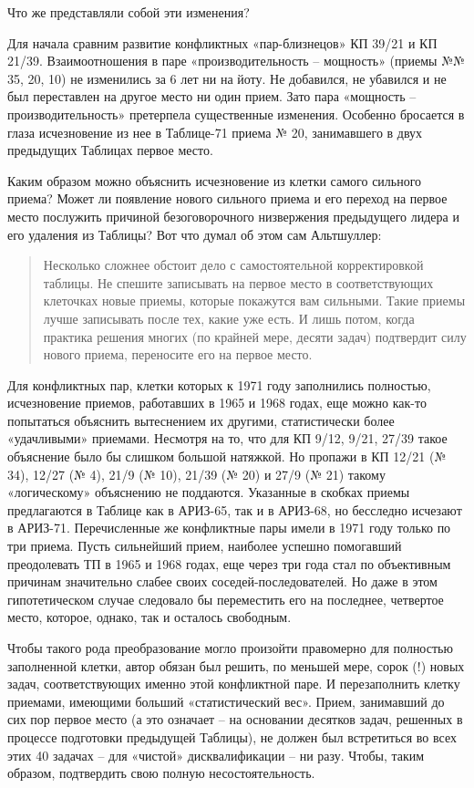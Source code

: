 \documentclass[11pt,a4paper]{article}
\begin{document}
Что же представляли собой эти изменения?

Для начала сравним развитие конфликтных «пар-близнецов» КП 39/21 и КП 21/39.
Взаимоотношения в паре «производительность -- мощность» (приемы №№ 35, 20, 10)
не изменились за 6 лет ни на йоту. Не добавился, не убавился и не был
переставлен на другое место ни один прием. Зато пара «мощность --
производительность» претерпела существенные изменения. Особенно бросается в
глаза исчезновение из нее в Таблице-71 приема № 20, занимавшего в двух
предыдущих Таблицах первое место.

Каким образом можно объяснить исчезновение из клетки самого сильного приема?
Может ли появление нового сильного приема и его переход на первое место
послужить причиной безоговорочного низвержения предыдущего лидера и его
удаления из Таблицы? Вот что думал об этом сам Альтшуллер:
\begin{quote}
  Несколько сложнее обстоит дело с самостоятельной корректировкой таблицы. Не
  спешите записывать на первое место в соответствующих клеточках новые приемы,
  которые покажутся вам сильными. Такие приемы лучше записывать после тех,
  какие уже есть. И лишь потом, когда практика решения многих (по крайней
  мере, десяти задач) подтвердит силу нового приема, переносите его на первое
  место.  \cite[стр. 274]{Altshuller1973}
\end{quote}
Для конфликтных пар, клетки которых к 1971 году заполнились полностью,
исчезновение приемов, работавших в 1965 и 1968 годах, еще можно как-то
попытаться объяснить вытеснением их другими, статистически более «удачливыми»
приемами. Несмотря на то, что для КП 9/12, 9/21, 27/39 такое объяснение было
бы слишком большой натяжкой. Но пропажи в КП 12/21 (№ 34), 12/27 (№ 4), 21/9
(№ 10), 21/39 (№ 20) и 27/9 (№ 21) такому «логическому» объяснению не
поддаются. Указанные в скобках приемы предлагаются в Таблице как в АРИЗ-65,
так и в АРИЗ-68, но бесследно исчезают в АРИЗ-71. Перечисленные же конфликтные
пары имели в 1971 году только по три приема. Пусть сильнейший прием, наиболее
успешно помогавший преодолевать ТП в 1965 и 1968 годах, еще через три года
стал по объективным причинам значительно слабее своих соседей-последователей.
Но даже в этом гипотетическом случае следовало бы переместить его на
последнее, четвертое место, которое, однако, так и осталось свободным.

Чтобы такого рода преобразование могло произойти правомерно для полностью
заполненной клетки, автор обязан был решить, по меньшей мере, сорок (!) новых
задач, соответствующих именно этой конфликтной паре. И перезаполнить клетку
приемами, имеющими больший «статистический вес». Прием, занимавший до сих пор
первое место (а это означает -- на основании десятков задач, решенных в
процессе подготовки предыдущей Таблицы), не должен был встретиться во всех
этих 40 задачах -- для «чистой» дисквалификации -- ни разу. Чтобы, таким
образом, подтвердить свою полную несостоятельность.
\end{document}
